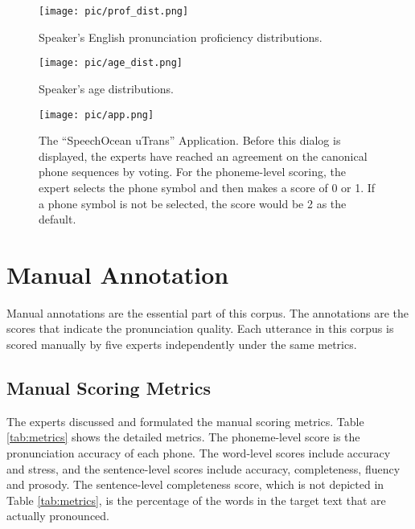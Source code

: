 \documentclass[a4paper]{article}
\begin{document}
\begin{figure}[t]
  \centering
  \texttt{[image: pic/prof\_dist.png]}
  \caption{Speaker's English pronunciation proficiency distributions.}
  \label{fig:prof_dist}
\end{figure}

\begin{figure}[t]
  \centering
  \texttt{[image: pic/age\_dist.png]}
  \caption{Speaker's age distributions.}
  \label{fig:age_dist}
\end{figure}

\begin{figure}[t]
  \centering
  \texttt{[image: pic/app.png]}
  \caption{The ``SpeechOcean uTrans'' Application. Before this dialog is displayed, the experts have reached an agreement on the canonical phone sequences by voting. For the phoneme-level scoring, the expert selects the phone symbol and then makes a score of 0 or 1. If a phone symbol is not be selected, the score would be 2 as the default.}
  \label{fig:speech_production}
\end{figure}
\section{Manual Annotation}

Manual annotations are the essential part of this corpus. The annotations are the scores that indicate the pronunciation quality. Each utterance in this corpus is scored manually by five experts independently under the same metrics.

\subsection{Manual Scoring Metrics}
The experts discussed and formulated the manual scoring metrics.
Table \ref{tab:metrics} shows the detailed metrics.
The phoneme-level score is the pronunciation accuracy of each phone. The word-level scores include accuracy and stress, and the sentence-level scores include accuracy, completeness, fluency and prosody.
The sentence-level completeness score, which is not depicted in Table \ref{tab:metrics}, is the percentage of the words in the target text that are actually pronounced.
\end{document}
